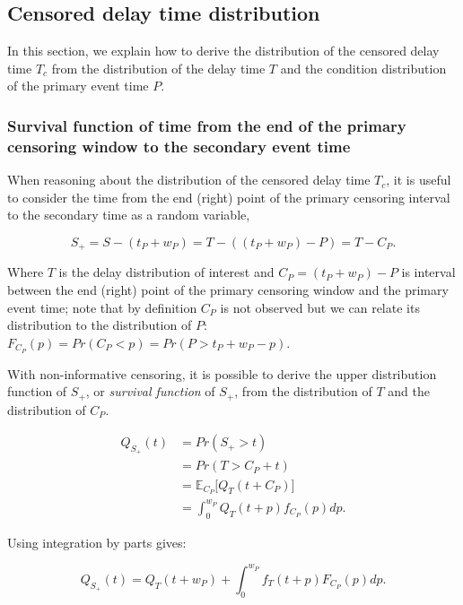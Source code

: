 \documentclass[10pt,letterpaper]{article}
\begin{document}
\subsection{Censored delay time distribution}
In this section, we explain how to derive the distribution of the censored delay time $T_c$ from the distribution of the delay time $T$ and the condition distribution of the primary event time $P$.

\subsubsection{Survival function of time from the end of the primary censoring window to the secondary event time}

When reasoning about the distribution of the censored delay time $T_c$, it is useful to consider the time from the end (right) point of the primary censoring interval to the secondary time as a random variable,

\begin{equation}
S_+ = S - (t_P + w_P) = T - ((t_P + w_P) - P) = T - C_P.
\end{equation}

Where $T$ is the delay distribution of interest and $C_P = (t_P + w_P) - P$ is interval between the end (right) point of the primary censoring window and the primary event time; note that by definition $C_P$ is not observed but we can relate its distribution to the distribution of $P$: $F_{C_P}(p) = Pr(C_P < p) = Pr(P > t_P + w_P - p)$.

With non-informative censoring, it is possible to derive the upper distribution function of $S_+$, or \textit{survival function} of $S_+$, from the distribution of $T$ and the distribution of $C_P$.


\begin{equation}
\begin{split}
Q_{S_+}(t) &= Pr(S_+ > t) \\
&= Pr(T > C_P + t) \\
&= \mathbb{E}_{C_P} \Big[Q_T(t + C_P)\Big] \\
&= \int_0^{w_P} Q_T(t + p) f_{C_P}(p) dp.
\end{split}
\end{equation}


Using integration by parts gives:

\begin{equation}
\label{eq:survivalfunc}
Q_{S_+}(t) = Q_T(t + w_P) + \int_0^{w_P} f_T(t+p) F_{C_P}(p) dp.
\end{equation}
\end{document}
